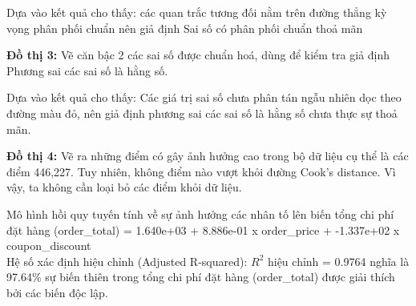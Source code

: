 Dựa vào kết quả cho thấy: các quan trắc tương đối nằm trên đường thẳng kỳ vọng phân phối chuẩn nên giả định Sai số có phân phối chuẩn thoả mãn

\textbf{Đồ thị 3:} Vẽ căn bậc 2 các sai số được chuẩn hoá, dùng để kiểm tra giả định Phương sai các sai số là hằng số.

Dựa vào kết quả cho thấy: Các giá trị sai số chưa phân tán ngẫu nhiên dọc theo đường màu đỏ, nên giả định phương sai các sai số là hằng số chưa thực sự thoả mãn.

\textbf{Đồ thị 4:} Vẽ ra những điểm có gây ảnh hưởng cao trong bộ dữ liệu cụ thể là các điểm 446,227. Tuy nhiên, không điểm nào vượt khỏi đường Cook's distance. Vì vậy, ta không cần loại bỏ các điểm khỏi dữ liệu.

 Mô hình hồi quy tuyến tính về sự ảnh hưởng các nhân tố lên biến tổng chi phí đặt hàng (order\_total) = 1.640e+03 + 8.886e-01 x order\_price  + -1.337e+02 x coupon\_discount \\

Hệ số xác định hiệu chỉnh (Adjusted R-squared): $R^2$ hiệu chỉnh  = 0.9764  nghĩa là 97.64\% sự biến thiên trong tổng chi phí đặt hàng (order\_total) được giải thích bởi các biến độc lập.


